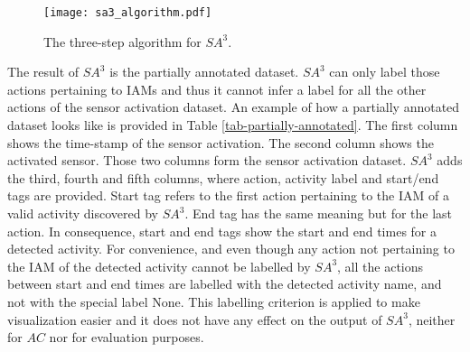 \begin{figure}[htbp]
\centering
\texttt{[image: sa3\_algorithm.pdf]}
    \caption{The three-step algorithm for $SA^3$.}
    \label{fig:sa3_algorithm}
\end{figure}

The result of $SA^3$ is the partially annotated dataset. $SA^3$ can only label those actions pertaining to IAMs and thus it cannot infer a label for all the other actions of the sensor activation dataset. An example of how a partially annotated dataset looks like is provided in Table \ref{tab-partially-annotated}. The first column shows the time-stamp of the sensor activation. The second column shows the activated sensor. Those two columns form the sensor activation dataset. $SA^3$ adds the third, fourth and fifth columns, where action, activity label and start/end tags are provided. Start tag refers to the first action pertaining to the IAM of a valid activity discovered by $SA^3$. End tag has the same meaning but for the last action. In consequence, start and end tags show the start and end times for a detected activity. For convenience, and even though any action not pertaining to the IAM of the detected activity cannot be labelled by $SA^3$, all the actions between start and end times are labelled with the detected activity name, and not with the special label None. This labelling criterion is applied to make visualization easier and it does not have any effect on the output of $SA^3$, neither for $AC$ nor for evaluation purposes.

\begin{comment}
\begin{figure}[htbp]
\begin{scriptsize}
\begin{lstlisting}
2014-05-23 07:42:17.106962,wsugarSens,hasFlavour,None,
2014-05-23 07:49:17.310460,bedSens,useFurniture,None,
2014-05-23 09:43:44.128079,cupSens,hasContainer,MakeChocolate,start
2014-05-23 09:47:33.984341,storeSens,openStore,MakeChocolate,
2014-05-23 09:47:39.333528,potSens,useCookingUtensil,MakeChocolate,
2014-05-23 09:47:52.750216,cookerSens,useCookingAppliance,MakeChocolate,
2014-05-23 09:48:07.764138,fridgeSens,openFridge,MakeChocolate,
2014-05-23 09:48:12.591836,wmilkSens,hasMilk,MakeChocolate,
2014-05-23 09:48:47.199512,chocoSens,hasChocolate,MakeChocolate,end
2014-05-23 09:54:11.553695,mugSens,hasContainer,None,
\end{lstlisting}
\end{scriptsize}
\caption{Example of a partially annotated dataset, the output of the $SA^3$ algorithm.}
\label{fig-partially-annotated}
\end{figure}
\end{comment}

